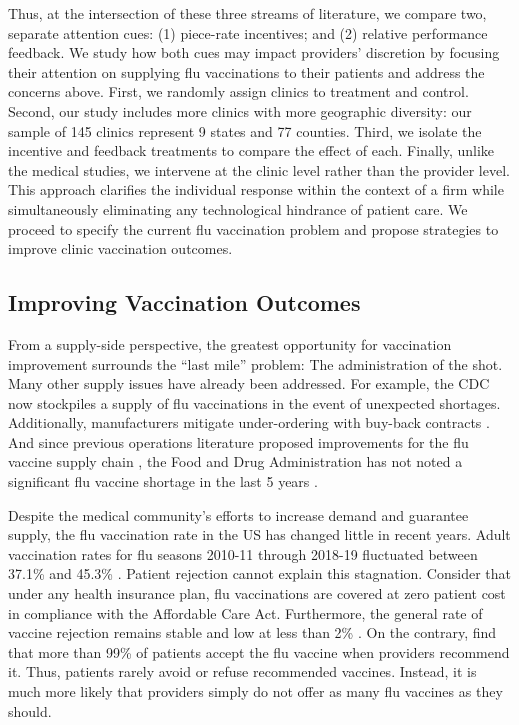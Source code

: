 \begin{onehalfspace}
 Thus, at the intersection of these three streams of literature, we compare two, separate attention cues: (1) piece-rate incentives; and (2) relative performance feedback. We study how both cues may impact providers’ discretion by focusing their attention on supplying flu vaccinations to their patients and address the concerns above. First, we randomly assign clinics to treatment and control. Second, our study includes more clinics with more geographic diversity: our sample of 145 clinics represent 9 states and 77 counties. Third, we isolate the incentive and feedback treatments to compare the effect of each. Finally, unlike the medical studies, we intervene at the clinic level rather than the provider level. This approach clarifies the individual response within the context of a firm while simultaneously eliminating any technological hindrance of patient care. We proceed to specify the current flu vaccination problem and propose strategies to improve clinic vaccination outcomes.  

 \subsection{Improving Vaccination Outcomes}
 From a supply-side perspective, the greatest opportunity for vaccination improvement surrounds the “last mile” problem: The administration of the shot. Many other supply issues have already been addressed. For example, the CDC now stockpiles a supply of flu vaccinations in the event of unexpected shortages. Additionally, manufacturers mitigate under-ordering with buy-back contracts \citep[e.g.,][]{Pasternack1985}. And since previous operations literature proposed improvements for the flu vaccine supply chain \citep{Deo2009,Cho2010,Arifoglu2012}, the Food and Drug Administration has not noted a significant flu vaccine shortage in the last 5 years \citep{FDA2020}. 
 
 Despite the medical community’s efforts to increase demand and guarantee supply, the flu vaccination rate in the US has changed little in recent years. Adult vaccination rates for flu seasons 2010-11 through 2018-19 fluctuated between 37.1\% and 45.3\% \citep{CDC2019}. Patient rejection cannot explain this stagnation. Consider that under any health insurance plan, flu vaccinations are covered at zero patient cost in compliance with the Affordable Care Act. Furthermore, the general rate of vaccine rejection remains stable and low at less than 2\% \citep{Brewer2017}. On the contrary, \cite{Patel2017} find that more than 99\% of patients accept the flu vaccine when providers recommend it. Thus, patients rarely avoid or refuse recommended vaccines. Instead, it is much more likely that providers simply do not offer as many flu vaccines as they should. 
 

\end{onehalfspace}
